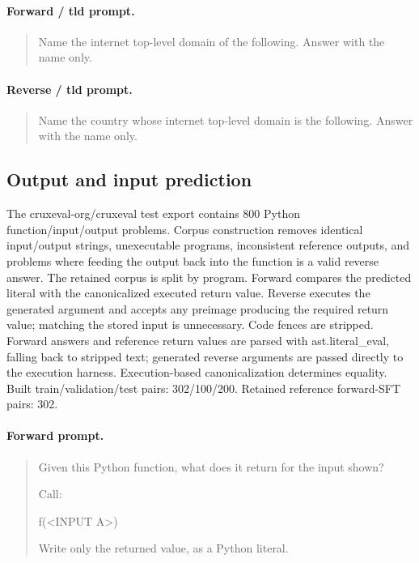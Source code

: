 \paragraph{Forward / tld prompt.}
\begin{quote}\small\ttfamily
Name the internet top-level domain of the following. Answer with the name only.\par \par <INPUT A>
\end{quote}
\paragraph{Reverse / tld prompt.}
\begin{quote}\small\ttfamily
Name the country whose internet top-level domain is the following. Answer with the name only.\par \par <INPUT B>
\end{quote}
\subsection{Output and input prediction}
The cruxeval-org/cruxeval test export contains 800 Python function/input/output problems. Corpus construction removes identical input/output strings, unexecutable programs, inconsistent reference outputs, and problems where feeding the output back into the function is a valid reverse answer. The retained corpus is split by program. Forward compares the predicted literal with the canonicalized executed return value. Reverse executes the generated argument and accepts any preimage producing the required return value; matching the stored input is unnecessary. Code fences are stripped. Forward answers and reference return values are parsed with ast.literal\_eval, falling back to stripped text; generated reverse arguments are passed directly to the execution harness. Execution-based canonicalization determines equality.
Built train/validation/test pairs: 302/100/200. Retained reference forward-SFT pairs: 302. 
\paragraph{Forward prompt.}
\begin{quote}\small\ttfamily
Given this Python function, what does it return for the input shown?\par \par <FUNCTION CODE>\par \par Call:\par f(<INPUT A>)\par \par Write only the returned value, as a Python literal.
\end{quote}
